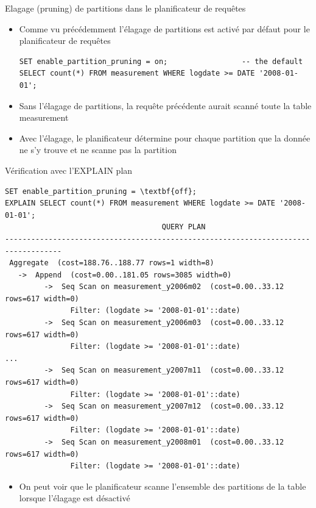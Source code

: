 \begin{frame}[fragile]{Elagage (pruning) de partitions dans le planificateur de requêtes}

   \begin{itemize}
      \item Comme vu précédemment l'élagage de partitions est activé par défaut pour le planificateur de requêtes
\begin{tiny}
\begin{Verbatim}[commandchars=\\\{\}]
SET enable_partition_pruning = on;                 -- the default
SELECT count(*) FROM measurement WHERE logdate >= DATE '2008-01-01';
\end{Verbatim}
\end{tiny}
      \item Sans l'élagage de partitions, la requête précédente aurait scanné toute la table measurement
      \item Avec l'élagage, le planificateur détermine pour chaque partition que la donnée ne s'y trouve et ne scanne pas la partition
   \end{itemize}

\end{frame}


\begin{frame}[fragile]{Vérification avec l'EXPLAIN plan}

\begin{tiny}
\begin{Verbatim}[commandchars=\#\{\}]
SET enable_partition_pruning = \textbf{off};
EXPLAIN SELECT count(*) FROM measurement WHERE logdate >= DATE '2008-01-01';
                                    QUERY PLAN
-----------------------------------------------------------------------------------
 Aggregate  (cost=188.76..188.77 rows=1 width=8)
   ->  Append  (cost=0.00..181.05 rows=3085 width=0)
         ->  Seq Scan on measurement_y2006m02  (cost=0.00..33.12 rows=617 width=0)
               Filter: (logdate >= '2008-01-01'::date)
         ->  Seq Scan on measurement_y2006m03  (cost=0.00..33.12 rows=617 width=0)
               Filter: (logdate >= '2008-01-01'::date)
...
         ->  Seq Scan on measurement_y2007m11  (cost=0.00..33.12 rows=617 width=0)
               Filter: (logdate >= '2008-01-01'::date)
         ->  Seq Scan on measurement_y2007m12  (cost=0.00..33.12 rows=617 width=0)
               Filter: (logdate >= '2008-01-01'::date)
         ->  Seq Scan on measurement_y2008m01  (cost=0.00..33.12 rows=617 width=0)
               Filter: (logdate >= '2008-01-01'::date)   
\end{Verbatim}
\end{tiny}

   \begin{itemize}
      \item On peut voir que le planificateur scanne l'ensemble des partitions de la table lorsque l'élagage est désactivé
   \end{itemize}

\end{frame}

